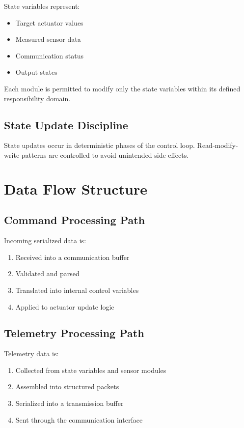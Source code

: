 State variables represent:

\begin{itemize}
	\item Target actuator values
	\item Measured sensor data
	\item Communication status
	\item Output states
\end{itemize}

Each module is permitted to modify only the state variables within its defined responsibility domain.

\subsection{State Update Discipline}

State updates occur in deterministic phases of the control loop.  
Read-modify-write patterns are controlled to avoid unintended side effects.


\section{Data Flow Structure}

\subsection{Command Processing Path}

Incoming serialized data is:

\begin{enumerate}
	\item Received into a communication buffer
	\item Validated and parsed
	\item Translated into internal control variables
	\item Applied to actuator update logic
\end{enumerate}

\subsection{Telemetry Processing Path}

Telemetry data is:

\begin{enumerate}
	\item Collected from state variables and sensor modules
	\item Assembled into structured packets
	\item Serialized into a transmission buffer
	\item Sent through the communication interface
\end{enumerate}

